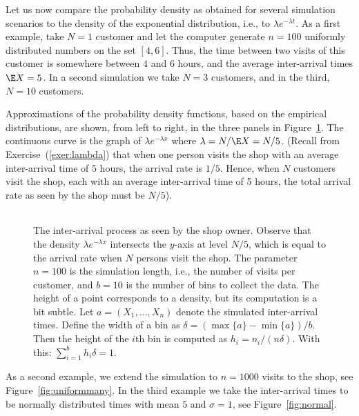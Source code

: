 Let us now compare the probability density as
obtained for several simulation scenarios to the density of the
exponential distribution, i.e., to $\lambda e^{-\lambda t}$.  As a
first example, take $N=1$ customer and let the computer generate
$n=100$ uniformly distributed numbers on the set $[4, 6]$.  Thus, the
time between two visits of this customer is somewhere between $4$ and
$6$ hours, and the average inter-arrival times $\E X = 5$. In a second
simulation we take $N=3$ customers, and in the third, $N=10$
customers. 

Approximations of the probability density functions, based on the empirical distributions, are shown, from left to right,
in the three panels in Figure~\ref{fig:uniformfew}. The continuous
curve is the graph of $\lambda e^{-\lambda x}$ where
$\lambda = N/\E X = N/5$. (Recall from Exercise~(\ref{exer:lambda}) that when one
person visits the shop  with an average inter-arrival time of $5$
hours,  the arrival rate is $1/5$. Hence, when $N$ customers visit the shop, each with an average inter-arrival time of 5 hours, the total arrival rate as seen by the shop must be $N/5$).


\begin{figure}[ht]
  \centering
  \begin{tabular}[h]{c}
 \\
  \end{tabular}
  \caption{The inter-arrival process as seen by the shop owner. Observe
    that the density $\lambda e^{-\lambda x}$ intersects the $y$-axis
    at level $N/5$, which is equal to the arrival rate when $N$
    persons visit the shop. The parameter $n=100$ is the simulation
    length, i.e., the number of visits per customer, and $b=10$ is the
    number of bins to collect the data. The height of a point corresponds to a density, but its computation is a bit subtle. Let $a=(X_1, \ldots, X_n)$ denote the simulated inter-arrival times. Define the width of a bin as $\delta = (\max\{a\} - \min\{a\})/b$. Then the height of the $i$th bin is computed as $h_i = n_i/(n \delta)$. With this: $\sum_{i=1}^b h_i \delta = 1$.}
  \label{fig:uniformfew}
\end{figure}

As a second
example, we extend the simulation to $n=1000$ visits to the shop, see
Figure~\ref{fig:uniformmany}. In the third example we take the
inter-arrival times to be normally distributed times with mean $5$ and
$\sigma=1$, see Figure~\ref{fig:normal}.

